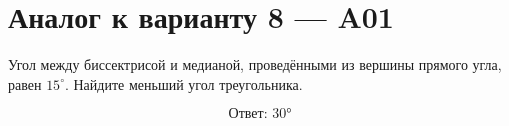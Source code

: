 


\section*{Аналог к варианту 8 — A01}
Угол между биссектрисой и медианой, проведёнными из вершины прямого угла, равен \(15^\circ\). Найдите меньший угол треугольника.
\begin{center}\figRightBisectorMedian\end{center}
\[\boxed{\text{Ответ: }30°}\]

